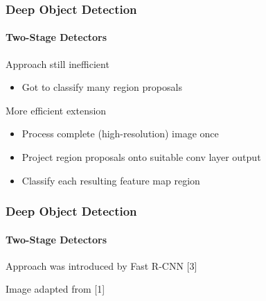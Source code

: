 \documentclass[xetex,professionalfont]{beamer}
\renewcommand\emph[1]{\textcolor{tuwcvl_cvl_blue}{#1}}
\begin{document}
\begin{frame}
	\frametitle{Deep Object Detection}
	\framesubtitle{Two-Stage Detectors}

	Approach still inefficient
	\begin{itemize}
		\item Got to classify many region proposals
	\end{itemize}

	\bigskip

	More efficient extension
	\begin{itemize}
		\item Process complete (high-resolution) image once
		\item Project region proposals onto suitable conv layer output %
		\item Classify each resulting feature map region
	\end{itemize}

\end{frame}


\begin{frame}
	\frametitle{Deep Object Detection}
	\framesubtitle{Two-Stage Detectors}

	Approach was introduced by \emph{Fast R-CNN} [3]


	\bigskip

	\begin{center}
		{\centering Image adapted from [1]}
	\end{center}

\end{frame}
\end{document}
